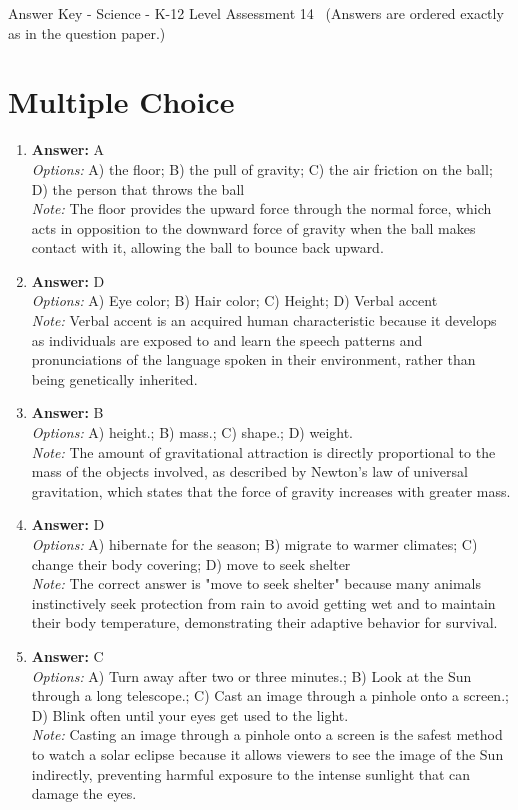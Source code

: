 \documentclass[12pt]{article}
\begin{document}
\begin{center}
Answer Key - Science - K-12 Level Assessment 14 \
\small (Answers are ordered exactly as in the question paper.)
\end{center}

\section*{Multiple Choice}
\begin{enumerate}[label=\arabic*.]
\item \textbf{Answer:} A
\\ \textit{Options:} A) the floor; B) the pull of gravity; C) the air friction on the ball; D) the person that throws the ball
\\ \textit{Note:} The floor provides the upward force through the normal force, which acts in opposition to the downward force of gravity when the ball makes contact with it, allowing the ball to bounce back upward.
\item \textbf{Answer:} D
\\ \textit{Options:} A) Eye color; B) Hair color; C) Height; D) Verbal accent
\\ \textit{Note:} Verbal accent is an acquired human characteristic because it develops as individuals are exposed to and learn the speech patterns and pronunciations of the language spoken in their environment, rather than being genetically inherited.
\item \textbf{Answer:} B
\\ \textit{Options:} A) height.; B) mass.; C) shape.; D) weight.
\\ \textit{Note:} The amount of gravitational attraction is directly proportional to the mass of the objects involved, as described by Newton's law of universal gravitation, which states that the force of gravity increases with greater mass.
\item \textbf{Answer:} D
\\ \textit{Options:} A) hibernate for the season; B) migrate to warmer climates; C) change their body covering; D) move to seek shelter
\\ \textit{Note:} The correct answer is "move to seek shelter" because many animals instinctively seek protection from rain to avoid getting wet and to maintain their body temperature, demonstrating their adaptive behavior for survival.
\item \textbf{Answer:} C
\\ \textit{Options:} A) Turn away after two or three minutes.; B) Look at the Sun through a long telescope.; C) Cast an image through a pinhole onto a screen.; D) Blink often until your eyes get used to the light.
\\ \textit{Note:} Casting an image through a pinhole onto a screen is the safest method to watch a solar eclipse because it allows viewers to see the image of the Sun indirectly, preventing harmful exposure to the intense sunlight that can damage the eyes.
\end{enumerate}
\end{document}
